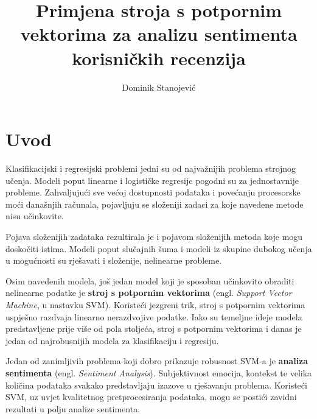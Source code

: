 \documentclass[times, utf8, zavrsni, numeric]{fer}
\begin{document}

\title{Primjena stroja s potpornim vektorima za analizu sentimenta korisničkih recenzija}

\author{Dominik Stanojević}

\maketitle



\zahvala{}

\tableofcontents

\chapter{Uvod}

\par Klasifikacijski i regresijski problemi jedni su od najvažnijih problema strojnog učenja. 
Modeli poput linearne i logističke regresije pogodni su za jednostavnije probleme.
Zahvaljujući sve većoj dostupnosti podataka i povećanju procesorske moći današnjih računala,
pojavljuju se složeniji zadaci za koje navedene metode nisu učinkovite.

\par Pojava složenijih zadataka rezultirala je i pojavom složenijih metoda koje mogu doskočiti 
istima. Modeli poput slučajnih šuma i modeli iz skupine dubokog učenja u mogućnosti su rješavati i složenije, 
nelinearne probleme.

\par Osim navedenih modela, još jedan model koji je sposoban učinkovito obraditi nelinearne podatke 
je \textbf{stroj s potpornim vektorima} (engl. \textit{Support Vector Machine}, u nastavku SVM).
Koristeći jezgreni trik, stroj s potpornim vektorima uspješno razdvaja linearno nerazdvojive podatke.
Iako su temeljne ideje modela predstavljene prije više od pola stoljeća, stroj s potpornim vektorima i danas je jedan od
najrobusnijih modela za klasifikaciju i regresiju.

\par Jedan od zanimljivih problema koji dobro prikazuje robusnost SVM-a je \textbf{analiza sentimenta}
(engl. \textit{Sentiment Analysis}).
Subjektivnost emocija, kontekst te velika količina podataka svakako predstavljaju izazove u rješavanju problema.
Koristeći SVM, uz uvjet kvalitetnog pretprocesiranja podataka, mogu se postići zavidni rezultati u polju analize sentimenta.
\end{document}
